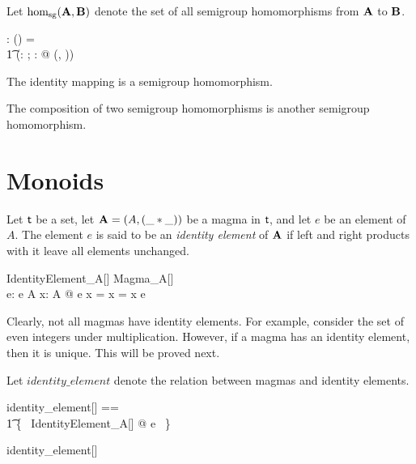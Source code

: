 \documentclass{amsart}
\begin{document}
Let $\operatorname{hom_{sg}}(\mathbf{A}, \mathbf{B})$ denote the set of all semigroup homomorphisms from $\mathbf{A}$ to $\mathbf{B}$.

\begin{gendef}[\genT, \genU]
	\homSemigroup: \semigroup \genT \cross \semigroup \genU \fun \power (\genT \pfun \genU)
\where
	\homSemigroup = \\
	\t1	(\lambda \strucA: \semigroup \genT; \strucB: \semigroup \genU @ \homMagma(\strucA, \strucB))
\end{gendef}

\begin{remark}
The identity mapping is a semigroup homomorphism.
\end{remark}

\begin{remark}
The composition of two semigroup homomorphisms is another semigroup homomorphism.
\end{remark}

\section{Monoids}

Let $\mathsf{t}$ be a set, let $\mathbf{A} = (A, (\_ \mathbin{*} \_))$ be a magma in $\mathsf{t}$, and let $e$ be an element of $A$.
The element $e$ is said to be an \textit{identity element} of $\mathbf{A}$ if left and right 
products with it leave all elements unchanged.

\begin{schema}{IdentityElement\_A}[\genT]
	Magma\_A[\genT] \\
	e: \genT
\where
	e \in A
\also
	\forall x: A @ e \mulA x = x = x \mulA e
\end{schema}

Clearly, not all magmas have identity elements.
For example, consider the set of even integers under multiplication.
However, if a magma has an identity element, then it is unique.
This will be proved next.

Let $identity\_element$ denote the relation between magmas and identity elements.
\begin{zed}
	identity\_element[\genT] == \\
	\t1	\{~ IdentityElement\_A[\genT] @ \strucA \mapsto e ~\}
\end{zed}

\begin{remark}
\begin{zed}
	identity\_element[\setT] \in \magma \setT \rel \setT
\end{zed}
\end{remark}
\end{document}
